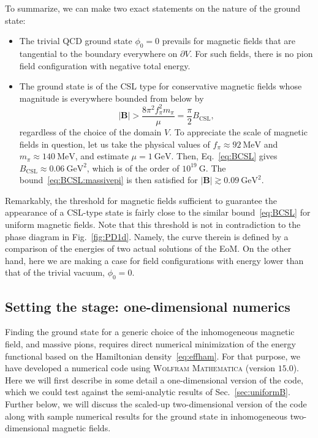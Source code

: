 \documentclass[pdflatex,iicol,sn-mathphys-num]{sn-jnl}
\let\m=\mu
\let\p=\phi
\let\de=\partial
\newcommand{\vek}[1]{\bm{#1}}%
\begin{document}
To summarize, we can make two exact statements on the nature of the ground state:
\begin{itemize}
\item The trivial QCD ground state $\p_0=0$ prevails for magnetic fields that are tangential to the boundary everywhere on $\de V$. For such fields, there is no pion field configuration with negative total energy.
\item The ground state is of the CSL type for conservative magnetic fields whose magnitude is everywhere bounded from below by
\begin{equation}
|\vek B|>\frac{8\pi^2f_\pi^2m_\pi}{\m}=\frac\pi2B_\text{CSL},
\label{eq:BCSL:massivepi}
\end{equation}
regardless of the choice of the domain $V$. To appreciate the scale of magnetic fields in question, let us take the physical values of $f_\pi\approx92~\text{MeV}$ and $m_\pi\approx140~\text{MeV}$, and estimate $\mu=1~\text{GeV}$. Then, Eq.~\eqref{eq:BCSL} gives $B_\text{CSL}\approx0.06~\text{GeV}^{2}$, which is of the order of $10^{19}~\text{G}$. The bound~\eqref{eq:BCSL:massivepi} is then satisfied for $|\vek B|\gtrsim0.09~\text{GeV}^{2}$.
\end{itemize}
Remarkably, the threshold for magnetic fields sufficient to guarantee the appearance of a CSL-type state is fairly close to the similar bound~\eqref{eq:BCSL} for uniform magnetic fields. Note that this threshold is not in contradiction to the phase diagram in Fig.~\ref{fig:PD1d}. Namely, the curve therein is defined by a comparison of the energies of two actual solutions of the EoM. On the other hand, here we are making a case for field configurations with energy lower than that of the trivial vacuum, $\p_0=0$.


\subsection{Setting the stage: one-dimensional numerics}
\label{subsec:nonuniformBnonzeroMbenchmark}

Finding the ground state for a generic choice of the inhomogeneous magnetic field, and massive pions, requires direct numerical minimization of the energy functional based on the Hamiltonian density~\eqref{eq:effham}. For that purpose, we have developed a numerical code using \textsc{Wolfram Mathematica} (version $15.0$). Here we will first describe in some detail a one-dimensional version of the code, which we could test against the semi-analytic results of Sec.~\ref{sec:uniformB}. Further below, we will discuss the scaled-up two-dimensional version of the code along with sample numerical results for the ground state in inhomogeneous two-dimensional magnetic fields.
\end{document}
